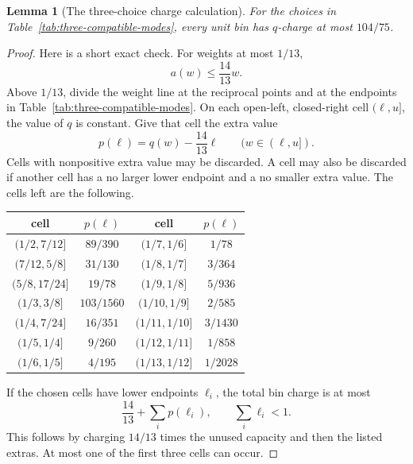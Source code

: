 \documentclass[11pt]{article}
\newtheorem{lemma}[theorem]{Lemma}
\theoremstyle{definition}\newtheorem{algorithm}{Algorithm}[section]
\numberwithin{equation}{section}
\theoremstyle{remark}\newtheorem*{remark}{Remark}
\begin{document}
\begin{lemma}[The three-choice charge calculation]
\label{lem:three-mode-charge}
For the choices in Table~\ref{tab:three-compatible-modes}, every unit
bin has $q$-charge at most $104/75$.
\end{lemma}
\begin{proof}
Here is a short exact check.  For weights at most $1/13$,
\[
 a(w)\le\frac{14}{13}w.
\]
Above $1/13$, divide the weight line at the reciprocal points and at
the endpoints in Table~\ref{tab:three-compatible-modes}.  On each open-left,
closed-right cell $(\ell,u]$, the value of $q$ is constant.  Give that
cell the extra value
\[
 p(\ell)=q(w)-\frac{14}{13}\ell
 \qquad(w\in(\ell,u]).
\]
Cells with nonpositive extra value may be discarded.  A cell may also be
discarded if another cell has a no larger lower endpoint and a no smaller
extra value.  The cells left are the following.

\begin{center}
\small
\begin{tabular}{c|c@{\qquad}c|c}
cell & $p(\ell)$ & cell & $p(\ell)$\\ \hline
$(1/2,7/12]$&$89/390$&$(1/7,1/6]$&$1/78$\\
$(7/12,5/8]$&$31/130$&$(1/8,1/7]$&$3/364$\\
$(5/8,17/24]$&$19/78$&$(1/9,1/8]$&$5/936$\\
$(1/3,3/8]$&$103/1560$&$(1/10,1/9]$&$2/585$\\
$(1/4,7/24]$&$16/351$&$(1/11,1/10]$&$3/1430$\\
$(1/5,1/4]$&$9/260$&$(1/12,1/11]$&$1/858$\\
$(1/6,1/5]$&$4/195$&$(1/13,1/12]$&$1/2028$
\end{tabular}
\end{center}

If the chosen cells have lower endpoints $\ell_i$, the total bin charge
is at most
\[
 \frac{14}{13}+\sum_i p(\ell_i),
 \qquad \sum_i\ell_i<1.                         \tag{*}
\]
This follows by charging $14/13$ times the unused capacity and then the
listed extras.  At most one of the first three cells can occur.


\end{proof}
\end{document}
